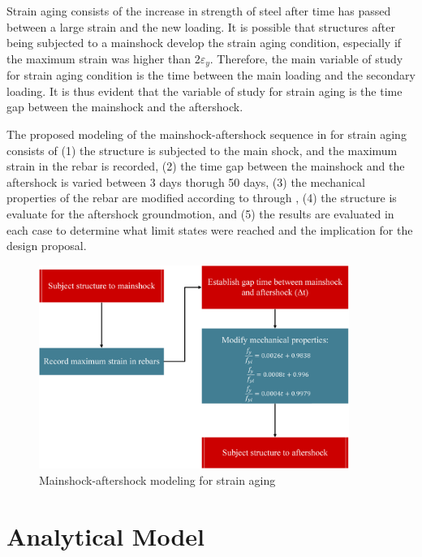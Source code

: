 Strain aging consists of the increase in strength of steel after time has passed between a large strain and the new loading. It is possible that structures after being subjected to a mainshock develop the strain aging condition, especially if the maximum strain was higher than $2\varepsilon_{y}$. Therefore, the main variable of study for strain aging condition is the time between the main loading and the secondary loading. It is thus evident that the variable of study for strain aging is the time gap between the mainshock and the aftershock. 

The proposed modeling of the mainshock-aftershock sequence in for strain aging consists of (1) the structure is subjected to the main shock, and the maximum strain in the rebar is recorded, (2) the time gap between the mainshock and the aftershock is varied between 3 days thorugh 50 days, (3) the mechanical properties of the rebar are modified according to  through , (4) the structure is evaluate for the aftershock groundmotion, and (5) the results are evaluated in each case to determine what limit states were reached and the implication for the design proposal.

\begin{figure}[htbp]
	\centering
	\includegraphics[width=0.9\textwidth]{Chapter-5/figs/StrainAgeing_Modeling}
	\caption{Mainshock-aftershock modeling for strain aging}
	\label{fig:AgingModel}
\end{figure}

\newpage
\section{Analytical Model}

